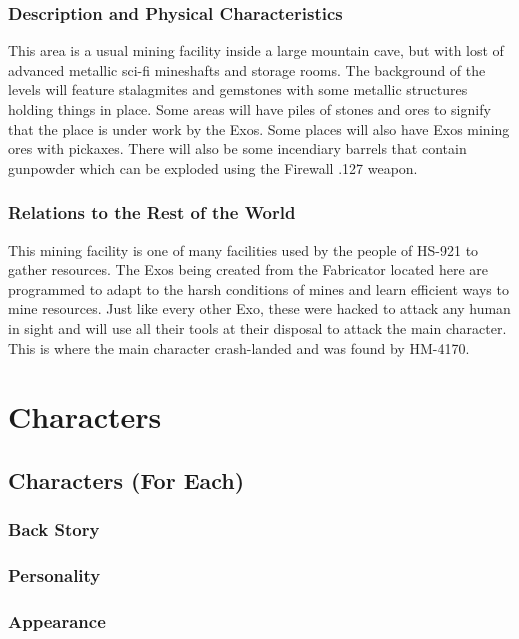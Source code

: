 \documentclass[12pt]{article}
\begin{document}
\subsubsection{Description and Physical Characteristics}

This area is a usual mining facility inside a large mountain cave, but with lost of advanced metallic sci-fi mineshafts and storage rooms. The background of the levels will feature stalagmites and gemstones with some metallic structures holding things in place. Some areas will have piles of stones and ores to signify that the place is under work by the Exos. Some places will also have Exos mining ores with pickaxes. There will also be some incendiary barrels that contain gunpowder which can be exploded using the Firewall .127 weapon. 

\subsubsection{Relations to the Rest of the World}

This mining facility is one of many facilities used by the people of HS-921 to gather resources. The Exos being created from the Fabricator located here are programmed to adapt to the harsh conditions of mines and learn efficient ways to mine resources. Just like every other Exo, these were hacked to attack any human in sight and will use all their tools at their disposal to attack the main character. This is where the main character crash-landed and was found by HM-4170.

\section{Characters}

\subsection{Characters (For Each)}

\subsubsection{Back Story}

\subsubsection{Personality}

\subsubsection{Appearance}
\end{document}
